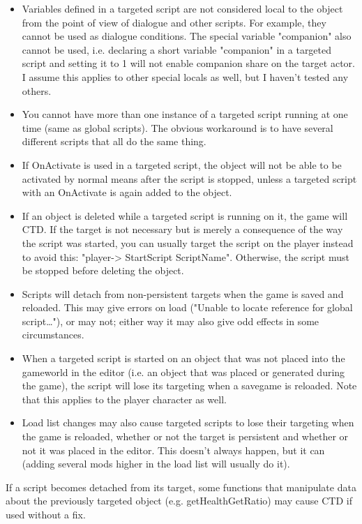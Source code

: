 \begin{itemize}
\item
  Variables defined in a targeted script are not considered local to the
  object from the point of view of dialogue and other scripts. For
  example, they cannot be used as dialogue conditions. The special
  variable "companion" also cannot be used, i.e. declaring a short
  variable "companion" in a targeted script and setting it to 1 will not
  enable companion share on the target actor. I assume this applies to
  other special locals as well, but I haven't tested any others.
\item
  You cannot have more than one instance of a targeted script running at
  one time (same as global scripts). The obvious workaround is to have
  several different scripts that all do the same thing.
\item
  If OnActivate is used in a targeted script, the object will not be
  able to be activated by normal means after the script is stopped,
  unless a targeted script with an OnActivate is again added to the
  object.
\item
  If an object is deleted while a targeted script is running on it, the
  game will CTD. If the target is not necessary but is merely a
  consequence of the way the script was started, you can usually target
  the script on the player instead to avoid this:
  "player-> StartScript ScriptName". Otherwise, the script
  must be stopped before deleting the object.
\item
  Scripts will detach from non-persistent targets when the game is saved
  and reloaded. This may give errors on load ("Unable to locate
  reference for global script\ldots"), or may not; either way it may
  also give odd effects in some circumstances.
\item
  When a targeted script is started on an object that was not placed
  into the gameworld in the editor (i.e. an object that was placed or
  generated during the game), the script will lose its targeting when a
  savegame is reloaded. Note that this applies to the player character
  as well.
\item
  Load list changes may also cause targeted scripts to lose their
  targeting when the game is reloaded, whether or not the target is
  persistent and whether or not it was placed in the editor. This
  doesn't always happen, but it can (adding several mods higher in the
  load list will usually do it).
\end{itemize}

If a script becomes detached from its target, some functions that
manipulate data about the previously targeted object (e.g.
getHealthGetRatio) may cause CTD if used without a fix.

